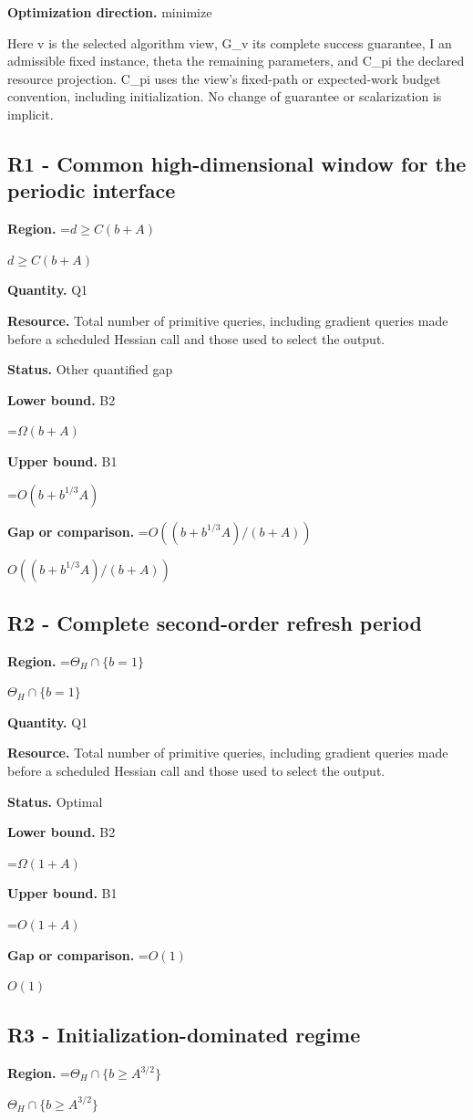 \documentclass[10pt,a4paper]{article}
\newcommand{\AtlasMath}[1]{\par\begingroup\centering\setbox0=\hbox{$\displaystyle #1$}\ifdim\wd0>1.4\linewidth\typeout{ATLAS WIDE FORMULA: \the\wd0}\fi\ifdim\wd0>\linewidth\resizebox{\linewidth}{!}{\box0}\else\box0\fi\par\endgroup}
\newcommand{\AtlasInlineMath}[1]{\begingroup\setbox0=\hbox{$#1$}\ifdim\wd0>.4\linewidth\endgroup\AtlasMath{#1}\else\endgroup$#1$\fi}
\begin{document}
\textbf{Optimization direction.} minimize

Here v is the selected algorithm view, G\_v its complete success guarantee, I an admissible fixed instance, theta the remaining parameters, and C\_pi the declared resource projection. C\_pi uses the view's fixed-path or expected-work budget convention, including initialization. No change of guarantee or scalarization is implicit.

\subsection{R1 - Common high-dimensional window for the periodic interface}
\textbf{Region.} \AtlasInlineMath{d\ge C(b+A)}

\textbf{Quantity.} Q1

\textbf{Resource.} Total number of primitive queries, including gradient queries made before a scheduled Hessian call and those used to select the output.

\textbf{Status.} Other quantified gap

\textbf{Lower bound.} B2

\AtlasMath{\Omega(b+A)}
\textbf{Upper bound.} B1

\AtlasMath{O(b+b^{1/3}A)}
\textbf{Gap or comparison.} \AtlasInlineMath{O((b+b^{1/3}A)/(b+A))}

\subsection{R2 - Complete second-order refresh period}
\textbf{Region.} \AtlasInlineMath{\Theta_H\cap\{b=1\}}

\textbf{Quantity.} Q1

\textbf{Resource.} Total number of primitive queries, including gradient queries made before a scheduled Hessian call and those used to select the output.

\textbf{Status.} Optimal

\textbf{Lower bound.} B2

\AtlasMath{\Omega(1+A)}
\textbf{Upper bound.} B1

\AtlasMath{O(1+A)}
\textbf{Gap or comparison.} \AtlasInlineMath{O(1)}

\subsection{R3 - Initialization-dominated regime}
\textbf{Region.} \AtlasInlineMath{\Theta_H\cap\{b\ge A^{3/2}\}}
\end{document}
